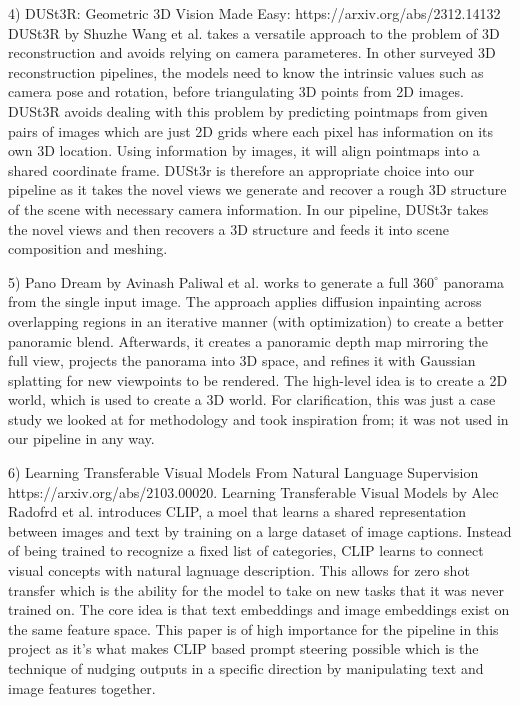 \documentclass{article}
\begin{document}
4) DUSt3R: Geometric 3D Vision Made Easy: https://arxiv.org/abs/2312.14132
DUSt3R by Shuzhe Wang et al. takes a versatile approach to the problem of 3D reconstruction and avoids relying on camera parameteres. In other surveyed 3D reconstruction pipelines, the models need to know the intrinsic values such as camera pose and rotation, before triangulating 3D points from 2D images. DUSt3R avoids dealing with this problem by predicting pointmaps from given pairs of images which are just 2D grids where each pixel has information on its own 3D location. Using information by images, it will align pointmaps into a shared coordinate frame. DUSt3r is therefore an appropriate choice into our pipeline as it takes the novel views we generate and recover a rough 3D structure of the scene with necessary  camera information. In our pipeline, DUSt3r takes the novel views and then recovers a 3D structure and feeds it into scene composition and meshing.

5) Pano Dream by Avinash Paliwal et al.
works to generate a full $360^\circ$ panorama from the single input image. The approach applies diffusion inpainting across overlapping regions in an iterative manner (with optimization) to create a better panoramic blend. Afterwards, it creates a panoramic depth map mirroring the full view, projects the panorama into 3D space, and refines it with Gaussian splatting for new viewpoints to be rendered. The high-level idea is to create a 2D world, which is used to create a 3D world. For clarification, this was just a case study we looked at for methodology and took inspiration from; it was not used in our pipeline in any way.

6) Learning Transferable Visual Models From Natural Language Supervision
https://arxiv.org/abs/2103.00020.
Learning Transferable Visual Models by Alec Radofrd et al. introduces CLIP, a moel that learns a shared representation between images and text by training on a large dataset of image captions. Instead of being trained to recognize a fixed list of categories, CLIP learns to connect visual concepts with natural lagnuage description. This allows for zero shot transfer which is the ability for the model to take on new tasks that it was never trained on. The core idea is that text embeddings and image embeddings exist on the same feature space. This paper is of high importance for the pipeline in this project as it's what makes CLIP based prompt steering possible which is the technique of nudging outputs in a specific direction by manipulating text and image features together.
\end{document}
